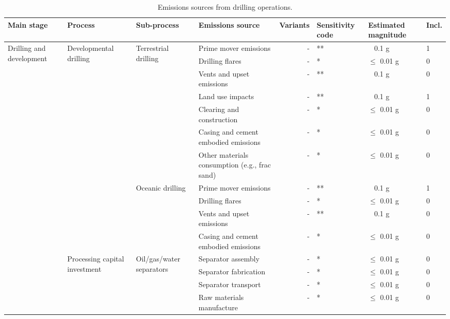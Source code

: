 \documentclass[11pt]{report}
\begin{document}
{{{{\begin{landscape}
\begin{table}
\begin{scriptsize}
\caption{Emissions sources from drilling operations.}
\label{tab:drilling_sources}
\begin{tabular}{|p{}|p{}|p{}|p{}|r|p{}|p{}|p{}|}
\hline
\textbf{Main stage} & \textbf{Process} & \textbf{Sub-process} & \textbf{Emissions source} & \textbf{Variants}& \textbf{Sensitivity code} & \textbf{Estimated magnitude} & \textbf{Incl.}\\
\hline
\multirow{30}{0.08\columnwidth}{Drilling and development} & \multirow{11}{0.09\columnwidth}{Developmental drilling} & \multirow{7}{0.12\columnwidth}{Terrestrial drilling} & Prime mover emissions & - & ** & ~ 0.1 g & 1\\
\cline{4-8}
& & & Drilling flares & - & * & $\leq$ 0.01 g & 0\\
\cline{4-8}
& & & Vents and upset emissions & - & ** & ~ 0.1 g & 0\\
\cline{4-8}
& & & Land use impacts & - & ** & ~ 0.1 g & 1\\
\cline{4-8}
& & & Clearing and construction & - & * & $\leq$ 0.01 g & 0\\
\cline{4-8}
& & & Casing and cement embodied emissions & - & * & $\leq$ 0.01 g & 0\\
\cline{4-8}
& & & Other materials consumption (e.g., frac sand) & - & * & $\leq$ 0.01 g & 0\\
\cline{3-8}
& & \multirow{4}{*}{Oceanic drilling} & Prime mover emissions & - & ** & ~ 0.1 g & 1\\
\cline{4-8}
& & & Drilling flares & - & * & $\leq$ 0.01 g & 0\\
\cline{4-8}
& & & Vents and upset emissions & - & ** & ~ 0.1 g & 0\\
\cline{4-8}
& & & Casing and cement embodied emissions & - & * & $\leq$ 0.01 g & 0\\
\cline{2-8}
& \multirow{8}{0.09\columnwidth}{Processing capital investment} & \multirow{4}{0.12\columnwidth}{Oil/gas/water separators} & Separator assembly & - & * & $\leq$ 0.01 g & 0\\
\cline{4-8}
& & & Separator fabrication & - & * & $\leq$ 0.01 g & 0\\
\cline{4-8}
& & & Separator transport & - & * & $\leq$ 0.01 g & 0\\
\cline{4-8}
& & & Raw materials manufacture & - & * & $\leq$ 0.01 g & 0\\

\end{tabular}
\end{scriptsize}
\end{table}
\end{landscape}}}}}
\end{document}
